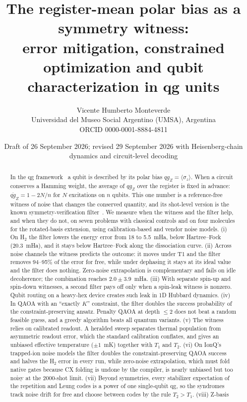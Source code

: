 \documentclass[11pt]{article}
\title{The register-mean polar bias as a symmetry witness:\\
error mitigation, constrained optimization and qubit characterization in qg units}
\author{Vicente Humberto Monteverde\\
\small Universidad del Museo Social Argentino (UMSA), Argentina\\
\small ORCID 0000-0001-8884-4811}
\date{\small Draft of 26 September 2026; revised 29 September 2026 with Heisenberg-chain dynamics and circuit-level decoding}
\newcommand{\qgZ}{qg_Z}
\newcommand{\mqg}{\overline{qg}_Z}
\begin{document}
\maketitle

\begin{abstract}
In the qg framework~\cite{monteverde2026qang} a qubit is described by its polar bias
$\qgZ=\langle\sigma_z\rangle$. When a circuit conserves a Hamming weight, the average of $\qgZ$
over the register is fixed in advance: $\mqg=1-2N/n$ for $N$ excitations on $n$ qubits. This one
number is a reference-free witness of noise that changes the conserved quantity, and its shot-level
version is the known symmetry-verification filter~\cite{bonetmonroig2018,mcardle2019}. We measure
when the witness and the filter help, and when they do not, on seven problems with classical controls and on four molecules for the rotated-basis extension,
using calibration-based and vendor noise models. (i) On H$_2$ the filter lowers the energy error from
18 to 5.5~mHa, below Hartree--Fock (20.3~mHa), and it stays below Hartree--Fock along the
dissociation curve. (ii) Across noise channels the witness predicts the outcome: it moves under T1
and the filter removes 94--95\% of the error for free, while under dephasing it stays at its ideal
value and the filter does nothing. Zero-noise extrapolation is complementary and fails on idle
decoherence; the combination reaches $2.0\pm3.9$~mHa. (iii) With separate spin-up and spin-down
witnesses, a second filter pays off only when a spin-leak witness is nonzero. Qubit routing on a
heavy-hex device creates such leak in 1D Hubbard dynamics. (iv) In QAOA with an ``exactly $K$''
constraint, the filter doubles the success probability of the constraint-preserving ansatz. Penalty
QAOA at depth $\le2$ does not beat a random feasible guess, and a greedy algorithm beats all quantum
variants. (v) The witness relies on calibrated readout. A heralded sweep separates thermal
population from asymmetric readout error, which the standard calibration conflates, and gives an
unbiased effective temperature ($\pm1$~mK) together with $T_1$ and $T_2$. (vi) On IonQ's trapped-ion
noise models the filter doubles the constraint-preserving QAOA success and halves the H$_2$ error in
every run, while zero-noise extrapolation, which must fold native gates because CX folding is undone by
the compiler, is nearly unbiased but too noisy at the 2000-shot limit. (vii) Beyond symmetries, every
stabilizer expectation of the repetition and Leung codes is a power of one single-qubit qg, so the
syndromes track noise drift for free and choose between codes by the rule $T_2>T_1$. (viii) Z-basis

\end{abstract}
\end{document}
